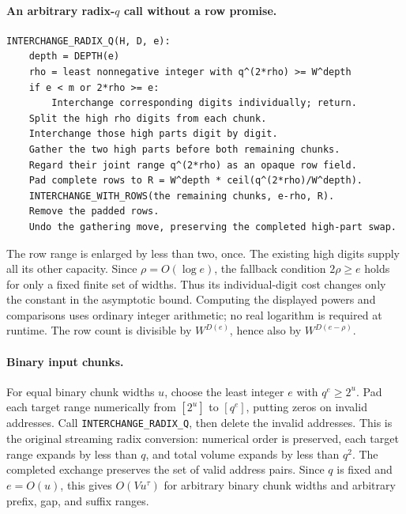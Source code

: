 \paragraph{An arbitrary radix-$q$ call without a row promise.}

\begin{verbatim}
INTERCHANGE_RADIX_Q(H, D, e):
    depth = DEPTH(e)
    rho = least nonnegative integer with q^(2*rho) >= W^depth
    if e < m or 2*rho >= e:
        Interchange corresponding digits individually; return.
    Split the high rho digits from each chunk.
    Interchange those high parts digit by digit.
    Gather the two high parts before both remaining chunks.
    Regard their joint range q^(2*rho) as an opaque row field.
    Pad complete rows to R = W^depth * ceil(q^(2*rho)/W^depth).
    INTERCHANGE_WITH_ROWS(the remaining chunks, e-rho, R).
    Remove the padded rows.
    Undo the gathering move, preserving the completed high-part swap.
\end{verbatim}

The row range is enlarged by less than two, once.  The existing high
digits supply all its other capacity.  Since $\rho=O(\log e)$, the
fallback condition $2\rho\ge e$ holds for only a fixed finite set of
widths.  Thus its individual-digit cost changes only the constant in
the asymptotic bound.  Computing the displayed powers and comparisons
uses ordinary integer arithmetic; no real logarithm is required at
runtime.  The row count is divisible by $W^{D(e)}$, hence also by
$W^{D(e-\rho)}$.

\paragraph{Binary input chunks.}
For equal binary chunk widths $u$, choose the least integer $e$ with
$q^e\ge2^u$.  Pad each target range numerically from $[2^u]$ to $[q^e]$,
putting zeros on invalid addresses.  Call
\texttt{INTERCHANGE\_RADIX\_Q}, then delete the invalid addresses.
This is the original streaming radix conversion: numerical order is
preserved, each target range expands by less than $q$, and total volume
expands by less than $q^2$.  The completed exchange preserves the set of
valid address pairs.  Since $q$ is fixed and $e=O(u)$, this gives
$O(Vu^\tau)$ for arbitrary binary chunk widths and arbitrary prefix,
gap, and suffix ranges.
